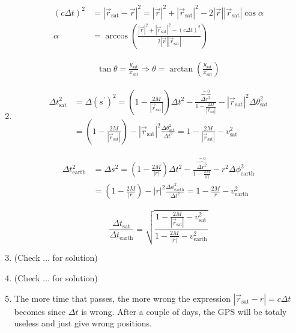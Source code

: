 \documentclass[a4paper,10pt,english]{article}
\begin{document}
\begin{enumerate}
\begin{align*}
(c\Delta t)^{2}&=|\vec{r}_{\text{sat}}-\vec{r}|^{2}=|\vec{r}|^{2}+|\vec{r}_{\text{sat}}|^{2}-2|\vec{r}||\vec{r}_{\text{sat}}|\cos{\alpha}\\
\alpha&=\arccos{\left(\frac{|\vec{r}|^{2}+|\vec{r}_{\text{sat}}|^{2}-(c\Delta t)^{2}}{2|\vec{r}||\vec{r}_{\text{sat}}|}\right)}
\end{align*}

\begin{align*}
\tan{\theta}=\frac{y_{\text{sat}}}{x_{\text{sat}}} \Rightarrow \theta=\arctan{\left(\frac{y_{\text{sat}}}{x_{\text{sat}}}\right)}
\end{align*}


\item 

\begin{align*}
\Delta t_{\text{sat}}^{2}&=\Delta (s^{\prime})^{2}=\left(1-\frac{2M}{|\vec{r}_{\text{sat}}|}\right)\Delta t^{2}-\frac{\overbrace{\Delta r^{2}}^{=0}}{1-\frac{2M}{|\vec{r}_{\text{sat}}|}}-|\vec{r}_{\text{sat}}|^{2}\Delta\theta^{2}_{\text{sat}}\\
&=\left(1-\frac{2M}{|\vec{r}_{\text{sat}}|}\right)-|\vec{r}_{\text{sat}}|^{2}\frac{\Delta\theta^{2}_{\text{sat}}}{\Delta t^{2}}=1-\frac{2M}{|\vec{r}_{\text{sat}}|}-v_{\text{sat}}^{2}
\end{align*}

\begin{align*}
\Delta t_{\text{earth}}^{2}&=\Delta s^{2}=\left(1-\frac{2M}{|r|}\right)\Delta t^{2}-\frac{\overbrace{\Delta r^{2}}^{=0}}{1-\frac{2M}{|r|}}-r^{2}\Delta\phi^{2}_{\text{earth}}\\
&=\left(1-\frac{2M}{|r|}\right)-|r|^{2}\frac{\Delta\phi^{2}_{\text{earth}}}{\Delta t^{2}}=1-\frac{2M}{r}-v_{\text{earth}}^{2}
\end{align*}

\begin{equation*}
\frac{\Delta t_{\text{sat}}}{\Delta t_{\text{earth}}}=\sqrt{\frac{1-\frac{2M}{|\vec{r}_{\text{sat}}|}-v_{\text{sat}}^{2}}{1-\frac{2M}{|r|}-v_{\text{earth}}^{2}}}
\end{equation*}

\item (Check $\ldots$ for solution)

\item (Check $\ldots$ for solution)

\item The more time that passes, the more wrong the expression $|\vec{r}_{\text{sat}}-r|=c\Delta t$ becomes since $\Delta t$ is wrong. After a couple of days, the GPS will be totaly useless and just give wrong positions.

\end{enumerate}
\newpage
\end{document}
